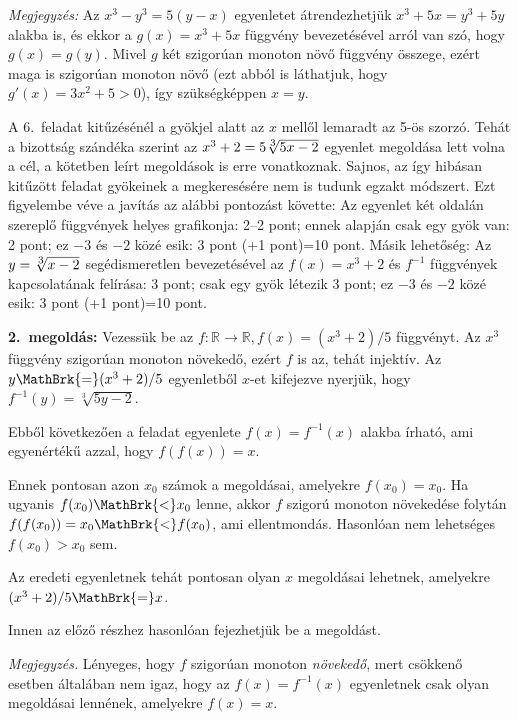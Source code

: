 \documentclass[a4paper,10pt]{article}
\begin{document}
\medskip

\emph{Megjegyzés:} Az $x^3-y^3=5(y-x)$ egyenletet átrendezhetjük $x^3+5x=y^3+5y$ alakba is, és ekkor a $g(x)=x^3+5x$ függvény bevezetésével arról van szó, hogy $g(x)=g(y)$. Mivel $g$ két szigorúan monoton növő függvény összege, ezért maga is szigorúan monoton növő (ezt abból is láthatjuk, hogy $g'(x)=3x^2+5>0$), így szükségképpen $x=y$.

\medskip
\noindent A 6.~feladat kitűzésénél a gyökjel alatt az $x$ mellől lemaradt az 5-ös
szorzó. Tehát a bizottság szándéka szerint az $x^3+2=5\root\scriptstyle
3\of{5x-2}$ egyenlet megoldása lett volna a cél, a kötetben leírt megoldások
is erre vonatkoznak. Sajnos, az így hibásan kitűzött feladat gyökeinek a
megkeresésére nem is tudunk egzakt módszert. Ezt figyelembe véve a javítás
az alábbi pontozást követte: Az egyenlet két oldalán szereplő
függvények helyes grafikonja: 2--2 pont; ennek alapján csak egy gyök van: 2
pont; ez $-3$ és $-2$ közé esik: 3 pont (+1 pont)=10 pont. Másik lehetőség:
Az $y=\root\scriptstyle 3\of{x-2}$ segédismeretlen bevezetésével az
$f(x)=x^3+2$ és $f^{-1}$ függvények kapcsolatának felírása: 3 pont; csak
egy gyök létezik 3 pont; ez $-3$ és $-2$ közé esik: 3 pont (+1 pont)=10 pont.

\medskip

{\bf 2.~megoldás:} Vezessük be az $f\colon\mathbb{R}\to\mathbb{R},f(x)=(x^3+2)/5$ függvényt. Az $x^3$ függvény szigorúan monoton növekedő, ezért $f$ is az, tehát injektív. Az $y\MathBrk{=}(x^3+2)/5$ egyenletből $x$-et kifejezve nyerjük, hogy $f^{-1}(y)=\sqrt[3]{5y-2}$. 

\smallskip

\noindent Ebből következően a feladat egyenlete $f(x)=f^{-1}(x)$ alakba írható, ami egyenértékű azzal, hogy $f(f(x))=x$. 

\smallskip

\noindent Ennek pontosan azon $x_0$ számok a megoldásai, amelyekre $f(x_0)=x_0$. Ha ugyanis $f(x_0)\MathBrk{<}x_0$ lenne, akkor $f$ szigorú monoton növekedése folytán $f(f(x_0))=x_0\MathBrk{<}f(x_0)$, ami ellentmondás. Hasonlóan nem lehetséges $f(x_0)>x_0$ sem.
 
\noindent Az eredeti egyenletnek tehát pontosan olyan $x$ megoldásai lehetnek, amelyekre $(x^3+2)/5\MathBrk{=}x$. 

\smallskip

\noindent  Innen az előző részhez hasonlóan fejezhetjük be a megoldást. 

\medskip

\emph{Megjegyzés.} Lényeges, hogy $f$ szigorúan monoton \emph{növekedő}, mert csökkenő esetben általában nem igaz, hogy az $f(x)=f^{-1}(x)$ egyenletnek csak olyan megoldásai lennének, amelyekre $f(x)=x$.
\end{document}
